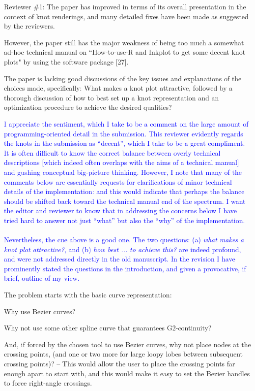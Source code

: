 \documentclass[12pt]{article}
\begin{document}
Reviewer \#1: The paper has improved in terms of its overall
presentation in the context of knot renderings, and many detailed
fixes have been made as suggested by the reviewers.

However, the paper still has the major weakness of being too much a
somewhat ad-hoc technical manual on ``How-to-use-R and Inkplot to get
some decent knot plots" by using the software package [27].


The paper is lacking good discussions of the key issues and
explanations of the choices made, specifically: What makes a knot plot
attractive, followed by a thorough discussion of how to best set up a
knot representation and an optimization procedure to achieve the
desired qualities?

\textcolor{blue}{ I appreciate the sentiment, which I take to be a
  comment on the large amount of programming-oriented detail in the
  submission.  This reviewer evidently regards the knots in the
  submission as ``decent'', which I take to be a great compliment.  It
  is often difficult to know the correct balance between overly
  technical descriptions [which indeed often overlaps with the aims of
    a technical manual] and gushing conceptual big-picture thinking.
  However, I note that many of the comments below are essentially
  requests for clarifications of minor technical details of the
  implementation: and this would indicate that perhaps the balance
  should be shifted back toward the technical manual end of the
  spectrum.  I want the editor and reviewer to know that in addressing
  the concerns below I have tried hard to answer not just ``what'' but
  also the ``why'' of the implementation.  \\ \\ Nevertheless, the cue
  above is a good one.  The two questions: (a) {\em what makes a knot
    plot attractive?}, and (b) {\em how best ... to achieve this?}
  are indeed profound, and were not addressed directly in the old
  manuscript.  In the revision I have prominently stated the questions
  in the introduction, and given a provocative, if brief, outline of
  my view.}


The problem starts with the basic curve representation:

Why use Bezier curves? 

Why not use some other spline curve that guarantees G2-continuity?

And, if forced by the chosen tool to use Bezier curves, why not place
nodes at the crossing points, (and one or two more for large loopy
lobes between subsequent crossing points)?  -- This would allow the
user to place the crossing points far enough apart to start with, and
this would make it easy to set the Bezier handles to force right-angle
crossings.
\end{document}
